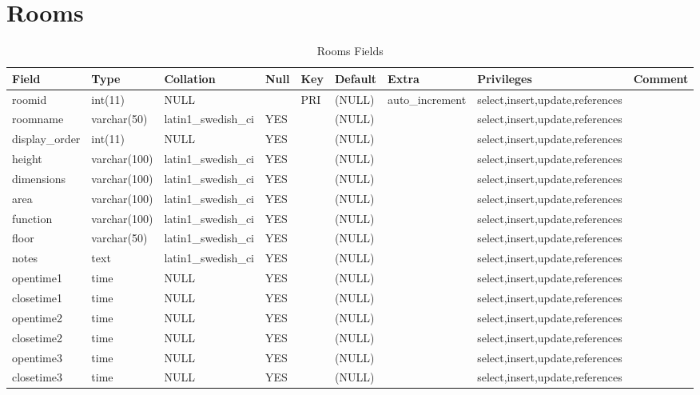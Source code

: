 \documentclass[captions=tablesignature]{scrartcl}
\begin{document}
\section{Rooms}
\label{sec-22}

\begin{table}[htb]
\caption{\label{tbl:roomsfields}Rooms Fields}
\centering
\begin{tabular}{lllllllll}
\hline
Field & Type & Collation & Null & Key & Default & Extra & Privileges & Comment\\
\hline
roomid & int(11) & NULL &  & PRI & (NULL) & auto\_increment & select,insert,update,references & \\
roomname & varchar(50) & latin1\_swedish\_ci & YES &  & (NULL) &  & select,insert,update,references & \\
display\_order & int(11) & NULL & YES &  & (NULL) &  & select,insert,update,references & \\
height & varchar(100) & latin1\_swedish\_ci & YES &  & (NULL) &  & select,insert,update,references & \\
dimensions & varchar(100) & latin1\_swedish\_ci & YES &  & (NULL) &  & select,insert,update,references & \\
area & varchar(100) & latin1\_swedish\_ci & YES &  & (NULL) &  & select,insert,update,references & \\
function & varchar(100) & latin1\_swedish\_ci & YES &  & (NULL) &  & select,insert,update,references & \\
floor & varchar(50) & latin1\_swedish\_ci & YES &  & (NULL) &  & select,insert,update,references & \\
notes & text & latin1\_swedish\_ci & YES &  & (NULL) &  & select,insert,update,references & \\
opentime1 & time & NULL & YES &  & (NULL) &  & select,insert,update,references & \\
closetime1 & time & NULL & YES &  & (NULL) &  & select,insert,update,references & \\
opentime2 & time & NULL & YES &  & (NULL) &  & select,insert,update,references & \\
closetime2 & time & NULL & YES &  & (NULL) &  & select,insert,update,references & \\
opentime3 & time & NULL & YES &  & (NULL) &  & select,insert,update,references & \\
closetime3 & time & NULL & YES &  & (NULL) &  & select,insert,update,references & \\
\hline
\end{tabular}
\end{table}
\end{document}
